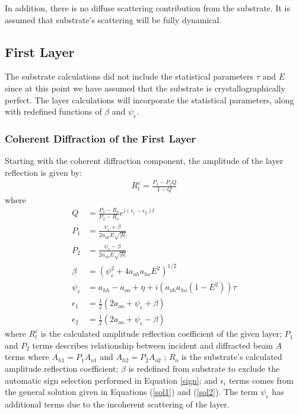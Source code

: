 In addition, there is no diffuse scattering contribution from the substrate.  It is assumed that substrate's scattering will be fully dynamical.

		\subsection{First Layer}

The substrate calculations did not include the statistical parameters $\tau$ and $E$ since at this point we have assumed that the substrate is crystallographically perfect.  The layer calculations will incorporate the statistical parameters, along with redefined functions of $\beta$ and $\psi_e$.

\subsubsection{Coherent Diffraction of the First Layer}

Starting with the coherent diffraction component, the amplitude of the layer reflection is given by:
\begin{align}
R_l^c =\frac{P_1 -P_2 Q}{1-Q}
\end{align}
where
\begin{align}
Q &= \frac{P_1 - R_o}{P_2-R_o} e^{i (\epsilon_1 - \epsilon_2) t}\\
P_1 &= \frac{\psi_e + \beta}{2a_{oh} E \sqrt{|b|}}\\
P_2 &= \frac{\psi_e - \beta}{2a_{oh} E \sqrt{|b|}}\\
\beta&=(\psi_e^2 + 4 a_{oh} a_{ho}E^2)^{1/2}\\
\psi_e &=  a_{hh} -a_{oo} + \eta + i (a_{oh} a_{ho} (1 - E ^2)) \tau\\
\epsilon_1&= \frac{1}{2} (2 a_{oo} + \psi_e + \beta)\\
\epsilon_2&= \frac{1}{2} (2 a_{oo} + \psi_e - \beta)
\end{align}
where $R_l^c$ is the calculated amplitude reflection coefficient of the given layer; $P_{1}$ and $P_2$ terms describes relationship between incident and diffracted beam $A$ terms where $A_{h1} = P_1 A_{o1}$ and $A_{h2} = P_2 A_{o2}$  ; $R_o$ is the substrate's calculated amplitude reflection coefficient; $\beta$ is redefined from substrate to exclude the automatic sign selection performed in Equation \ref{sign}; and $\epsilon_i$ terms comes from the general solution given in Equations (\ref{sol1}) and (\ref{sol2}). The term $\psi_e$ has additional terms due to the incoherent scattering of the layer.

